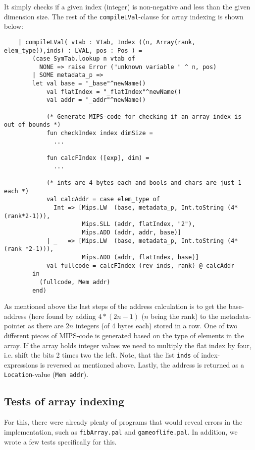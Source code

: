 \documentclass{article}
\begin{document}
It simply checks if a given index (integer) is non-negative and less than the given dimension size.
\newline
The rest of the \texttt{compileLVal}-clause for array indexing is shown below:
\begin{lstlisting}
    | compileLVal( vtab : VTab, Index ((n, Array(rank, elem_type)),inds) : LVAL, pos : Pos ) =
        (case SymTab.lookup n vtab of
          NONE => raise Error ("unknown variable " ^ n, pos)
        | SOME metadata_p =>
        let val base = "_base"^newName()
            val flatIndex = "_flatIndex"^newName()
            val addr = "_addr"^newName()

            (* Generate MIPS-code for checking if an array index is out of bounds *)
            fun checkIndex index dimSize =
              ...

            fun calcFIndex ([exp], dim) =
              ...

            (* ints are 4 bytes each and bools and chars are just 1 each *)
            val calcAddr = case elem_type of
              Int => [Mips.LW  (base, metadata_p, Int.toString (4*(rank*2-1))),
                      Mips.SLL (addr, flatIndex, "2"),
                      Mips.ADD (addr, addr, base)]
            | _   => [Mips.LW  (base, metadata_p, Int.toString (4*(rank *2-1))),
                      Mips.ADD (addr, flatIndex, base)]
            val fullcode = calcFIndex (rev inds, rank) @ calcAddr
        in
          (fullcode, Mem addr)
        end)
\end{lstlisting}
As mentioned above the last steps of the address calculation is to get the base-address (here
found by adding $4*(2n-1)$ ($n$ being the rank) to the metadata-pointer as there are $2n$
integers (of 4 bytes each) stored in a row. One of two different pieces of MIPS-code is generated
based on the type of elements in the array. If the array holds integer values we need to multiply
the flat index by four, i.e. shift the bits 2 times two the left. Note, that the list \texttt{inds}
of index-expressions is reversed as mentioned above. Lastly, the address is returned as a
\texttt{Location}-value (\texttt{Mem addr}).

\subsection{Tests of array indexing}
For this, there were already plenty of programs that would reveal errors in the implementation, such as \texttt{fibArray.pal} and \texttt{gameoflife.pal}. In addition, we wrote a few tests specifically for this. %
\end{document}

